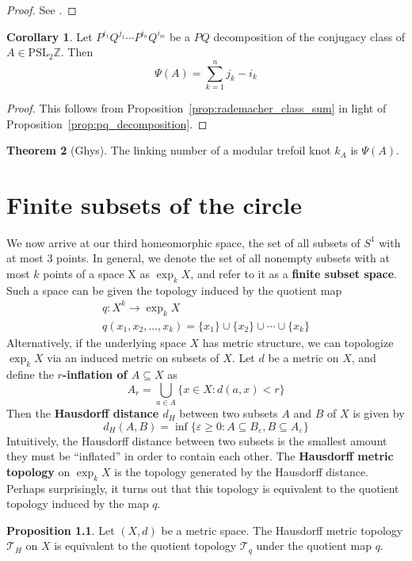 \documentclass[12pt,twoside]{reedthesis}
\theoremstyle{definition}
\newtheorem{thm}{Theorem}[chapter]
\newtheorem{cor}[thm]{Corollary}
\newtheorem{prop}[thm]{Proposition}
\newcommand{\Z}{\mathbb{Z}}
\newcommand{\PSLZ}{\mathrm{PSL}_2{\Z}}
\newcommand{\defnphrase}[1]{\textbf{#1}}
\begin{document}
\begin{proof}
  See \cite[58-60]{rademacher1972}.
\end{proof}

\begin{cor}
  Let $P^{i_1} Q^{j_1} \cdots P^{i_n} Q^{i_m}$ be a $PQ$ decomposition of the conjugacy class of $A \in \PSLZ$.
  Then
  \begin{equation*}
    \Psi(A) = \sum_{k=1}^n j_k - i_k
  \end{equation*}
\end{cor}

\begin{proof}
  This follows from Proposition~\ref{prop:rademacher_class_sum} in light of Proposition~\ref{prop:pq_decomposition}.
\end{proof}

\begin{thm}[Ghys]
  The linking number of a modular trefoil knot $k_A$ is $\Psi(A)$.
\end{thm}

\chapter{Finite subsets of the circle}\label{sec:finite_subsets}

We now arrive at our third homeomorphic space, the set of all subsets of $S^1$ with at most 3 points.
In general, we denote the set of all nonempty subsets with at most $k$ points of a space X as $\exp_k X$, and refer to it as a \defnphrase{finite subset space}.
Such a space can be given the topology induced by the quotient map
\begin{gather*}
  q : X^k \to \exp_k X \\
  q(x_1, x_2, \ldots, x_k) = \{x_1\} \cup \{x_2\} \cup \cdots \cup \{x_k\}
\end{gather*}
Alternatively, if the underlying space $X$ has metric structure, we can topologize $\exp_k X$ via an induced metric on subsets of $X$.
Let $d$ be a metric on $X$, and define the \defnphrase{$r$-inflation of $A \subseteq X$} as
\begin{equation*}
  A_r = \bigcup_{a \in A} \{ x \in X : d(a, x) < r \}
\end{equation*}
Then the \defnphrase{Hausdorff distance $d_H$} between two subsets $A$ and $B$ of $X$ is given by
\begin{equation*}
  d_H(A, B) = \inf \{ \varepsilon \geq 0 : A \subseteq B_\varepsilon, B \subseteq A_\varepsilon \}
\end{equation*}
Intuitively, the Hausdorff distance between two subsets is the smallest amount they must be ``inflated'' in order to contain each other.
The \defnphrase{Hausdorff metric topology} on $\exp_k X$ is the topology generated by the Hausdorff distance.
Perhaps surprisingly, it turns out that this topology is equivalent to the quotient topology induced by the map $q$.
\begin{prop}
  Let $(X, d)$ be a metric space.
  The Hausdorff metric topology $\mathcal{T}_H$ on $X$ is equivalent to the quotient topology $\mathcal{T}_q$ under the quotient map $q$.
\end{prop}
\end{document}
